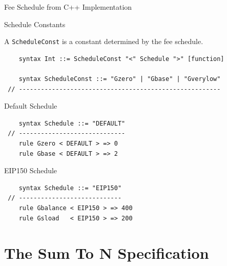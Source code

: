 \documentclass[8pt,ignorenonframetext,]{beamer}
\begin{document}
\begin{frame}[fragile]{Fee Schedule from C++ Implementation}

\pause

\begin{block}{Schedule Constants}

A \texttt{ScheduleConst} is a constant determined by the fee schedule.

\begin{verbatim}
    syntax Int ::= ScheduleConst "<" Schedule ">" [function]

    syntax ScheduleConst ::= "Gzero" | "Gbase" | "Gverylow"
 // -------------------------------------------------------
\end{verbatim}

\pause

\end{block}

\begin{block}{Default Schedule}

\begin{verbatim}
    syntax Schedule ::= "DEFAULT"
 // -----------------------------
    rule Gzero < DEFAULT > => 0
    rule Gbase < DEFAULT > => 2
\end{verbatim}

\pause

\end{block}

\begin{block}{EIP150 Schedule}

\begin{verbatim}
    syntax Schedule ::= "EIP150"
 // ----------------------------
    rule Gbalance < EIP150 > => 400
    rule Gsload   < EIP150 > => 200
\end{verbatim}

\end{block}

\end{frame}

\section{The Sum To N Specification}\label{the-sum-to-n-specification}
\end{document}
